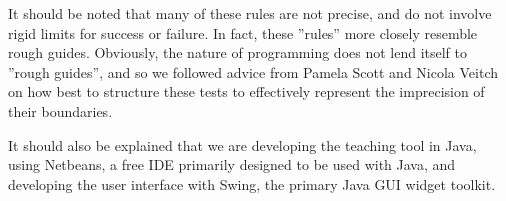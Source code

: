 It should be noted that many of these rules are not precise, and do not involve 
rigid limits for success or failure. In fact, these ''rules'' more closely 
resemble rough guides. Obviously, the nature of programming does not lend 
itself to ''rough guides'', and so we followed advice from Pamela Scott and 
Nicola Veitch on how best to structure these tests to effectively represent the 
imprecision of their boundaries.  

It should also be explained that we are developing the teaching tool in Java, 
using Netbeans, a free IDE primarily designed to be used with Java, and 
developing the user interface with Swing, the primary Java GUI widget toolkit.
